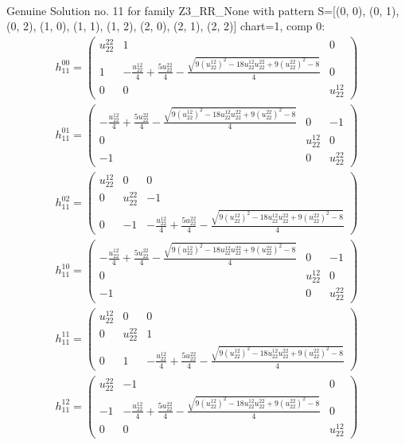 \documentclass[a4paper, 11pt, twoside, onecolumn]{article}
\begin{document}
\begin{landscape}
\begin{gather*}
\end{gather*} 
Genuine Solution no. 11 for family Z3_RR_None with pattern S=[(0, 0), (0, 1), (0, 2), (1, 0), (1, 1), (1, 2), (2, 0), (2, 1), (2, 2)] chart=1, comp 0: 
\begin{gather*} 
	 h_11^{00}=\begin{pmatrix}u^{22}_{22} & 1 & 0\\1 & - \frac{u^{12}_{22}}{4} + \frac{5 u^{22}_{22}}{4} - \frac{\sqrt{9 \left(u^{12}_{22}\right)^{2} - 18 u^{12}_{22} u^{22}_{22} + 9 \left(u^{22}_{22}\right)^{2} - 8}}{4} & 0\\0 & 0 & u^{12}_{22}\end{pmatrix}\\ 
	 h_11^{01}=\begin{pmatrix}- \frac{u^{12}_{22}}{4} + \frac{5 u^{22}_{22}}{4} - \frac{\sqrt{9 \left(u^{12}_{22}\right)^{2} - 18 u^{12}_{22} u^{22}_{22} + 9 \left(u^{22}_{22}\right)^{2} - 8}}{4} & 0 & -1\\0 & u^{12}_{22} & 0\\-1 & 0 & u^{22}_{22}\end{pmatrix}\\ 
	 h_11^{02}=\begin{pmatrix}u^{12}_{22} & 0 & 0\\0 & u^{22}_{22} & -1\\0 & -1 & - \frac{u^{12}_{22}}{4} + \frac{5 u^{22}_{22}}{4} - \frac{\sqrt{9 \left(u^{12}_{22}\right)^{2} - 18 u^{12}_{22} u^{22}_{22} + 9 \left(u^{22}_{22}\right)^{2} - 8}}{4}\end{pmatrix}\\ 
	 h_11^{10}=\begin{pmatrix}- \frac{u^{12}_{22}}{4} + \frac{5 u^{22}_{22}}{4} - \frac{\sqrt{9 \left(u^{12}_{22}\right)^{2} - 18 u^{12}_{22} u^{22}_{22} + 9 \left(u^{22}_{22}\right)^{2} - 8}}{4} & 0 & -1\\0 & u^{12}_{22} & 0\\-1 & 0 & u^{22}_{22}\end{pmatrix}\\ 
	 h_11^{11}=\begin{pmatrix}u^{12}_{22} & 0 & 0\\0 & u^{22}_{22} & 1\\0 & 1 & - \frac{u^{12}_{22}}{4} + \frac{5 u^{22}_{22}}{4} - \frac{\sqrt{9 \left(u^{12}_{22}\right)^{2} - 18 u^{12}_{22} u^{22}_{22} + 9 \left(u^{22}_{22}\right)^{2} - 8}}{4}\end{pmatrix}\\ 
	 h_11^{12}=\begin{pmatrix}u^{22}_{22} & -1 & 0\\-1 & - \frac{u^{12}_{22}}{4} + \frac{5 u^{22}_{22}}{4} - \frac{\sqrt{9 \left(u^{12}_{22}\right)^{2} - 18 u^{12}_{22} u^{22}_{22} + 9 \left(u^{22}_{22}\right)^{2} - 8}}{4} & 0\\0 & 0 & u^{12}_{22}\end{pmatrix}\\ 

\end{gather*}
\end{landscape}
\end{document}
